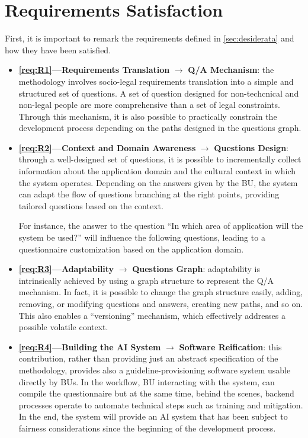 \documentclass[12pt,a4paper,openright,twoside]{book}
\begin{document}
\section{Requirements Satisfaction}

First, it is important to remark the requirements defined in \cref{sec:desiderata} and how they have been satisfied.

\begin{itemize}[label={}]

    \item \textbf{\ref{req:R1}---Requirements Translation} $\rightarrow$ \textbf{\ac{Q/A} Mechanism}:
    the methodology involves socio-legal requirements translation into a simple and structured set of questions. 
    A set of question designed for non-techcnical and non-legal people are more comprehensive than a set of legal constraints.
    Through this mechanism, it is also possible to practically constrain the development process depending on the paths designed in the questions graph.

    \item \textbf{\ref{req:R2}---Context and Domain Awareness} $\rightarrow$ \textbf{Questions Design}:
    through a well-designed set of questions, it is possible to incrementally collect information about the application domain and the cultural context in which the system operates.
    Depending on the answers given by the \ac{BU}, the system can adapt the flow of questions branching at the right points, providing tailored questions based on the context.
    
    For instance, the answer to the question ``In which area of application will the system be used?'' will influence the following questions, leading to a questionnaire customization based on the application domain.

    \item \textbf{\ref{req:R3}---Adaptability} $\rightarrow$ \textbf{Questions Graph}:
    adaptability is intrinsically achieved by using a graph structure to represent the \ac{Q/A} mechanism.
    In fact, it is possible to change the graph structure easily, adding, removing, or modifying questions and answers, creating new paths, and so on.
    This also enables a ``versioning'' mechanism, which effectively addresses a possible volatile context.
    
    \item \textbf{\ref{req:R4}---Building the AI System} $\rightarrow$ \textbf{Software Reification}:
    this contribution, rather than providing just an abstract specification of the methodology, provides also a guideline-provisioning software system usable directly by \acp{BU}.
    In the workflow, \ac{BU} interacting with the system, can compile the questionnaire but at the same time, behind the scenes, backend processes operate to automate technical steps such as training and mitigation.
    In the end, the system will provide an \ac{AI} system that has been subject to fairness considerations since the beginning of the development process.
\end{itemize}
\end{document}

